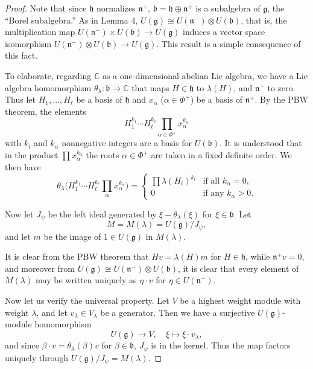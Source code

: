 \documentclass[12pt]{article}
\begin{document}
\begin{proof}
    Note that since $\mathfrak{h}$ normalizes $\mathfrak{n}^+$, $\mathfrak{b} = \mathfrak{h} \oplus \mathfrak{n}^+$ is a subalgebra of $\mathfrak{g}$, the ``Borel subalgebra.'' As in Lemma 4, $U(\mathfrak{g}) \cong U(\mathfrak{n}^-) \otimes U(\mathfrak{b})$, that is, the multiplication map $U(\mathfrak{n}^-) \times U(\mathfrak{b}) \to U(\mathfrak{g})$ induces a vector space isomorphism $U(\mathfrak{n}^-) \otimes U(\mathfrak{b}) \to U(\mathfrak{g})$. This result is a simple consequence of this fact.

    To elaborate, regarding $\mathbb{C}$ as a one-dimensional abelian Lie algebra, we have a Lie algebra homomorphism $\theta_\lambda : \mathfrak{b} \to \mathbb{C}$ that maps $H \in \mathfrak{h}$ to $\lambda(H)$, and $\mathfrak{n}^+$ to zero. Thus let $H_1, \dots, H_\ell$ be a basis of $\mathfrak{h}$ and $x_\alpha$ ($\alpha \in \Phi^+$) be a basis of $\mathfrak{n}^+$. By the PBW theorem, the elements
    \[
        H_1^{k_1} \cdots H_\ell^{k_\ell} \prod_{\alpha \in \Phi^+} x_\alpha^{k_\alpha}
    \]
    with $k_i$ and $k_\alpha$ nonnegative integers are a basis for $U(\mathfrak{b})$. It is understood that in the product $\prod x_\alpha^{k_\alpha}$ the roots $\alpha \in \Phi^+$ are taken in a fixed definite order. We then have
    \[
        \theta_\lambda \big( H_1^{k_1} \cdots H_\ell^{k_\ell} \prod_{\alpha} x_\alpha^{k_\alpha} \big)
        = \begin{cases}
            \prod \lambda(H_i)^{k_i} & \text{if all } k_\alpha = 0, \\
            0                        & \text{if any } k_\alpha > 0.
        \end{cases}
    \]

    Now let $J_\psi$ be the left ideal generated by $\xi - \theta_\lambda(\xi)$ for $\xi \in \mathfrak{b}$. Let
    \[
        M = M(\lambda) = U(\mathfrak{g})/J_\psi,
    \]
    and let $m$ be the image of $1 \in U(\mathfrak{g})$ in $M(\lambda)$.

    It is clear from the PBW theorem that $H v = \lambda(H)m$ for $H \in \mathfrak{h}$, while $\mathfrak{n}^+ v = 0$, and moreover from $U(\mathfrak{g}) \cong U(\mathfrak{n}^-) \otimes U(\mathfrak{b})$, it is clear that every element of $M(\lambda)$ may be written uniquely as $\eta \cdot v$ for $\eta \in U(\mathfrak{n}^-)$.

    Now let us verify the universal property. Let $V$ be a highest weight module with weight $\lambda$, and let $v_\lambda \in V_\lambda$ be a generator. Then we have a surjective $U(\mathfrak{g})$-module homomorphism
    \[
        U(\mathfrak{g}) \to V, \quad \xi \mapsto \xi \cdot v_\lambda,
    \]
    and since $\beta \cdot v = \theta_\lambda(\beta)v$ for $\beta \in \mathfrak{b}$, $J_\psi$ is in the kernel. Thus the map factors uniquely through $U(\mathfrak{g})/J_\psi = M(\lambda)$.
\end{proof}
\end{document}
